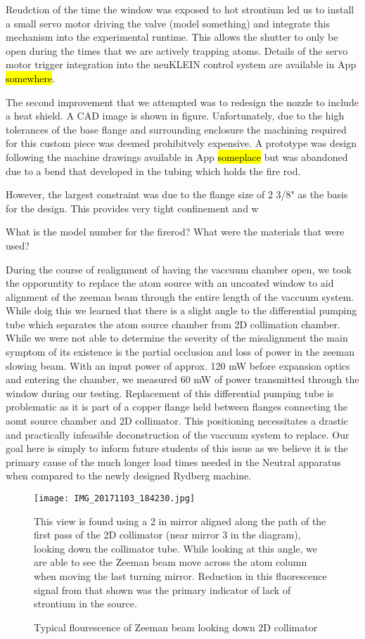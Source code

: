 Reudction of the time the window was exposed to hot strontium led us to install a small servo motor driving the valve (model something) and integrate this mechanism into the experimental runtime. This allows the shutter to only be open during the times that we are actively trapping atoms. Details of the servo motor trigger integration into the neuKLEIN control system are available in App \hl{somewhere}.

The second improvement that we attempted was to redesign the nozzle to include a heat shield. A CAD image is shown in figure. Unfortunately, due to the high tolerances of the base flange and surrounding enclosure the machining required for this custom piece was deemed prohibitvely expensive. A prototype was design following the machine drawings available in App \hl{someplace} but was abandoned due to a bend that developed in the tubing which holds the fire rod. 

However, the largest constraint was due to the flange size of 2 3/8" as the basis for the design. This provides very tight confinement and w

What is the model number for the firerod? What were the materials that were used? 

During the course of realignment of having the vaccuum chamber open, we took the opporuntity to replace the atom source with an uncoated window to aid alignment of the zeeman beam through the entire length of the vaccuum system. While doig this we learned that there is a slight angle to the differential pumping tube which separates the atom source chamber from 2D collimation chamber. While we were not able to determine the severity of the misalignment the main symptom of its existence is the partial occlusion and loss of power in the zeeman slowing beam. With an input power of approx. 120 mW before expansion optics and entering the chamber, we measured 60 mW of power transmitted through the window during our testing. Replacement of this differential pumping tube is problematic as it is part of a copper flange held between flanges connecting the aomt source chamber and 2D collimator. This positioning necessitates a drastic and practically infeasible deconstruction of the vaccuum system to replace. Our goal here is simply to inform future students of this issue as we believe it is the primary cause of the much longer load times needed in the Neutral apparatus when compared to the newly designed Rydberg machine.


	\begin{figure}
		\centerline{
		\texttt{[image: IMG\_20171103\_184230.jpg]}}
		\caption{Typical flourescence of Zeeman beam looking down 2D collimator}{This view is found using a 2 in mirror aligned along the path of the first pass of the 2D collimator (near mirror 3 in the diagram), looking down the collimator tube. While looking at this angle, we are able to see the Zeeman beam move across the atom column when moving the last turning mirror. Reduction in this fluorescence signal from that shown was the primary indicator of lack of strontium in the source.}
		\label{fig:2d_coll_flourescence}
	\end{figure} 
	
